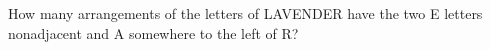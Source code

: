 How many arrangements of the letters of LAVENDER have the two E letters nonadjacent and A somewhere to the left of R?
